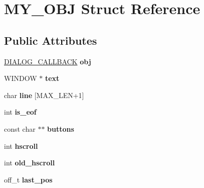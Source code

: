 \hypertarget{struct_m_y___o_b_j}{}\section{M\+Y\+\_\+\+O\+BJ Struct Reference}
\label{struct_m_y___o_b_j}
\subsection*{Public Attributes}
\begin{DoxyCompactItemize}
\item 
\hyperlink{struct__dlg__callback}{D\+I\+A\+L\+O\+G\+\_\+\+C\+A\+L\+L\+B\+A\+CK} {\bfseries obj}\hypertarget{struct_m_y___o_b_j_a6d9c2ff252d54817d0089ae4375bf031}{}\label{struct_m_y___o_b_j_a6d9c2ff252d54817d0089ae4375bf031}

\item 
W\+I\+N\+D\+OW $\ast$ {\bfseries text}\hypertarget{struct_m_y___o_b_j_a7c153f3eed8fb99ebf3d17c8bcff5b92}{}\label{struct_m_y___o_b_j_a7c153f3eed8fb99ebf3d17c8bcff5b92}

\item 
char {\bfseries line} \mbox{[}M\+A\+X\+\_\+\+L\+EN+1\mbox{]}\hypertarget{struct_m_y___o_b_j_a778dcf9e20db35822143c8606a120fee}{}\label{struct_m_y___o_b_j_a778dcf9e20db35822143c8606a120fee}

\item 
int {\bfseries is\+\_\+eof}\hypertarget{struct_m_y___o_b_j_ab0e828859f51b26c3a1a2532732255e8}{}\label{struct_m_y___o_b_j_ab0e828859f51b26c3a1a2532732255e8}

\item 
const char $\ast$$\ast$ {\bfseries buttons}\hypertarget{struct_m_y___o_b_j_a08b27bdcb3c6e9a51cc253816388356c}{}\label{struct_m_y___o_b_j_a08b27bdcb3c6e9a51cc253816388356c}

\item 
int {\bfseries hscroll}\hypertarget{struct_m_y___o_b_j_a0d4b503b737c3ca50dbc844fbe619f14}{}\label{struct_m_y___o_b_j_a0d4b503b737c3ca50dbc844fbe619f14}

\item 
int {\bfseries old\+\_\+hscroll}\hypertarget{struct_m_y___o_b_j_abbd5415744e10fc42bb0fc74bf1548e1}{}\label{struct_m_y___o_b_j_abbd5415744e10fc42bb0fc74bf1548e1}

\item 
off\+\_\+t {\bfseries last\+\_\+pos}\hypertarget{struct_m_y___o_b_j_a937036154f7112a69a2b3c38dd28533b}{}\label{struct_m_y___o_b_j_a937036154f7112a69a2b3c38dd28533b}


\end{DoxyCompactItemize}
